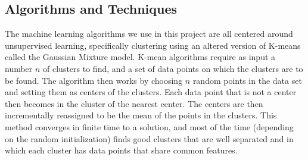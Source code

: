 \documentclass[journal,12pt,onecolumn,draftclsnofoot]{IEEEtran}  %
\begin{document}

%


\subsection{Algorithms and Techniques}
The machine learning algorithms we use in this project are all centered around unsupervised learning, specifically clustering using an altered version of K-means called the Gaussian Mixture model. K-mean algorithms require as input a number $n$ of clusters to find, and a set of data points on which the clusters are to be found. The algorithm then works by choosing $n$ random points in the data set and setting them as centers of the clusters. Each data point that is not a center then becomes in the cluster of the nearest center. The centers are then incrementally reassigned to be the mean of the points in the clusters. This method converges in finite time to a solution, and most of the time (depending on the random initialization) finds good clusters that are well separated and in which each cluster has data points that share common features. 
\end{document}
